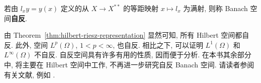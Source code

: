 \begin{Definition}
\label{def:reflexive-banach-space}
若由 $l_xy=y(x)$ 定义的从 $X\to X^{**}$ 的等距映射 $x\mapsto l_x$ 为满射, 则称 Banach 空间\textbf{自反}.
\end{Definition}

由 Theorem~\ref{thm:hilbert-riesz-representation} 显然可知, 所有 Hilbert 空间都自反. 此外, 空间 $L^p(\Omega)$, $1<p<\infty$, 也自反. 相比之下, 可以证明 $L^1(\Omega)$ 和 $L^\infty(\Omega)$ 不自反. 自反空间具有许多有用的性质, 因而便于分析. 在本书其余部分中, 将主要在 Hilbert 空间中工作, 不再进一步研究自反 Banach 空间. 请读者参阅有关文献, 例如 \cite{DS}.
